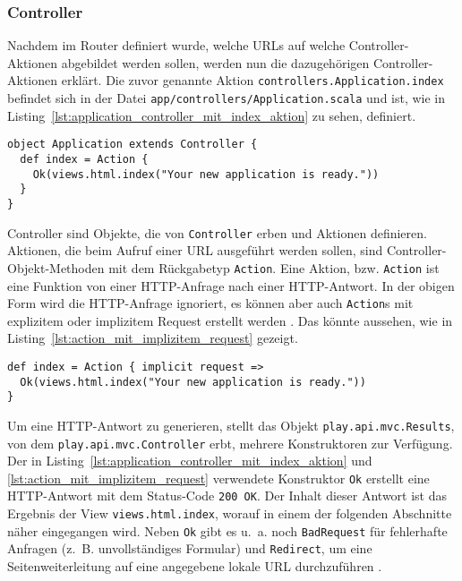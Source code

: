 

\subsubsection{Controller} %
\label{ssub:controller}

Nachdem im Router definiert wurde, welche URLs auf welche Controller-Aktionen abgebildet werden sollen, werden nun die dazugehörigen Controller-Aktionen erklärt.
Die zuvor genannte Aktion \lstinline[breaklines=true]|controllers.Application.index| befindet sich in der Datei \lstinline[breaklines=true]|app/controllers/Application.scala| und ist, wie in Listing~\ref{lst:application_controller_mit_index_aktion} zu sehen, definiert.

\begin{lstlisting}[caption=Der Application-Controller mit index-Aktion, label=lst:application_controller_mit_index_aktion]
object Application extends Controller {
  def index = Action {
    Ok(views.html.index("Your new application is ready."))
  }
}
\end{lstlisting}

Controller sind Objekte, die von \lstinline|Controller| erben und Aktionen definieren.
Aktionen, die beim Aufruf einer URL ausgeführt werden sollen, sind Controller-Objekt-Methoden mit dem Rückgabetyp \lstinline|Action|.
Eine Aktion, bzw. \lstinline|Action| ist eine Funktion von einer HTTP-Anfrage nach einer HTTP-Antwort.
In der obigen Form wird die HTTP-Anfrage ignoriert, es können aber auch \lstinline|Action|s mit explizitem oder implizitem Request erstellt werden \cite[vgl.][]{play_controllers}.
Das könnte aussehen, wie in Listing~\ref{lst:action_mit_implizitem_request} gezeigt.

\begin{lstlisting}[caption=Action mit implizitem Request, label=lst:action_mit_implizitem_request]
def index = Action { implicit request =>
  Ok(views.html.index("Your new application is ready."))
}
\end{lstlisting}

Um eine HTTP-Antwort zu generieren, stellt das Objekt \lstinline|play.api.mvc.Results|, von dem \lstinline|play.api.mvc.Controller| erbt, mehrere Konstruktoren zur Verfügung.
Der in Listing~\ref{lst:application_controller_mit_index_aktion} und \ref{lst:action_mit_implizitem_request} verwendete Konstruktor \lstinline|Ok| erstellt eine HTTP-Antwort mit dem Status-Code \lstinline|200 OK|.
Der Inhalt dieser Antwort ist das Ergebnis der View \lstinline|views.html.index|, worauf in einem der folgenden Abschnitte näher eingegangen wird.
Neben \lstinline|Ok| gibt es u.~a. noch \lstinline|BadRequest| für fehlerhafte Anfragen (z.~B. unvollständiges Formular) und \lstinline|Redirect|, um eine Seitenweiterleitung auf eine angegebene lokale URL durchzuführen \cite[vgl.][]{play_controllers}.





